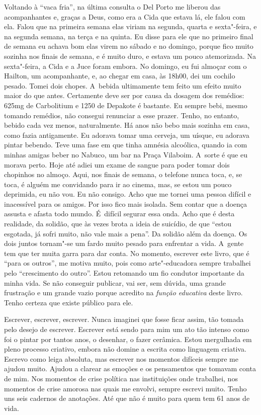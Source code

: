 Voltando à ``vaca fria'', na última consulta o Del Porto me liberou das
acompanhantes e, graças a Deus, como era a Cida que estava lá, ele falou
com ela. Falou que na primeira semana elas viriam na segunda, quarta e
sexta"-feira, e na segunda semana, na terça e na quinta. Eu disse para
ele que no primeiro final de semana eu achava bom elas virem no sábado e
no domingo, porque fico muito sozinha nos finais de semana, e é muito
duro, e estava um pouco atemorizada. Na sexta"-feira, a Cida e a Juce
foram embora. No domingo, eu fui almoçar com o Hailton, um acompanhante,
e, ao chegar em casa, às 18h00, dei um cochilo pesado. Tomei dois
chopes. A~bebida ultimamente tem feito um efeito muito maior do que
antes. Certamente deve ser por causa da dosagem dos remédios: 625mg de
Carbolitium e 1250 de Depakote é bastante. Eu sempre bebi, mesmo tomando
remédios, não consegui renunciar a esse prazer. Tenho, no entanto,
bebido cada vez menos, naturalmente. Há anos não bebo mais sozinha em
casa, como fazia antigamente. Eu adorava tomar uma cerveja, um uísque,
eu adorava pintar bebendo. Teve uma fase em que tinha amnésia alcoólica,
quando ia com minhas amigas beber no Nabuco, um bar na Praça Vilaboim. A~sorte é que eu morava perto. Hoje até adiei um exame de sangue para
poder tomar dois chopinhos no almoço. Aqui, nos finais de semana, o
telefone nunca toca, e, se toca, é alguém me convidando para ir ao
cinema, mas, se estou um pouco deprimida, eu não vou. Eu não consigo.
Acho que me tornei uma pessoa difícil e inacessível para os amigos. Por
isso fico mais isolada. Sem contar que a doença assusta e afasta todo
mundo. É~difícil segurar essa onda. Acho que é desta realidade, da
solidão, que às vezes brota a ideia de suicídio, de que ``estou
esgotada, já sofri muito, não vale mais a pena''. Da solidão além da
doença. Os dois juntos tornam"-se um fardo muito pesado para enfrentar a
vida. A~gente tem que ter muita garra para dar conta. No momento,
escrever este livro, que é ``para os outros'', me motiva muito, pois
como arte"-educadora sempre trabalhei pelo ``crescimento do outro''.
Estou retomando um fio condutor importante da minha vida. Se não
conseguir publicar, vai ser, sem dúvida, uma grande frustração e um
grande vazio porque acredito na \emph{função educativa}\textbf{} deste
livro. Tenho certeza que existe público para ele.

Escrever, escrever, escrever. Nunca imaginei que fosse ficar assim, tão
tomada pelo desejo de escrever. Escrever está sendo para mim um ato tão
intenso como foi o pintar por tantos anos, o desenhar, o fazer cerâmica.
Estou mergulhada em pleno processo criativo, embora não domine a escrita
como linguagem criativa. Escrevo como leiga absoluta, mas escrever nos
momentos difíceis sempre me ajudou muito. Ajudou a clarear as emoções e
os pensamentos que tomavam conta de mim. Nos momentos de crise política
nas instituições onde trabalhei, nos momentos de crise amorosa nas quais
me envolvi, sempre escrevi muito. Tenho uns seis cadernos de anotações.
Até que não é muito para quem tem 61 anos de vida.

